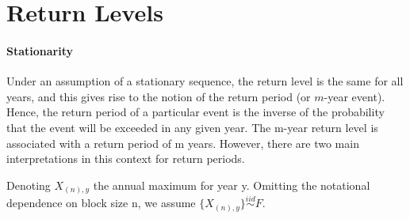 \section{Return Levels}\label{sec:returnlvlnstatio}


\paragraph*{ Stationarity} Under an assumption of a
stationary sequence, the return level is the same for all years, and this gives rise to the notion
of the return period (or $m$-year event). Hence, the return period of a particular event is the
inverse of the probability that the event will be exceeded in any given year. The m-year return level is associated with a return period of m years. However, there are two main interpretations in this context for return periods.

\cite[pp.100]{aghakouchak_extremes_2013-1}

Denoting $X_{(n),y}$ the annual maximum for year y. Omitting the notational dependence on block size n, we assume $\{X_{(n),y}\}\stackrel{iid}{\sim}F$. 

